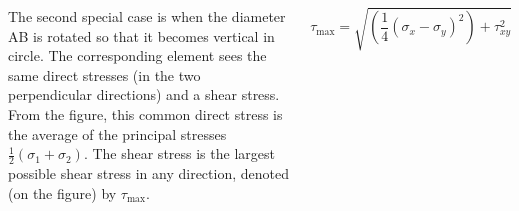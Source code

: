 \documentclass[20pt, a0paper, portrait]{tikzposter}
\begin{document}
\begin{columns}
{        The second special case is when the diameter AB is rotated so that it becomes vertical in circle. The corresponding element sees the same direct stresses (in the two perpendicular directions) and a shear stress. From the figure, this common direct stress is the average of the principal stresses \(\frac{1}{2}(\sigma_1+\sigma_2)\). The shear stress is the largest possible shear stress in any direction, denoted (on the figure) by \(\tau_{\max}\).

        \begin{equation}
          \tau_{\max} = \sqrt{\left(\frac{1}{4}(\sigma_x-\sigma_y)^2\right)+\tau_{xy}^2}
        \end{equation}
      }
  \end{columns}
  
  
\end{document}
